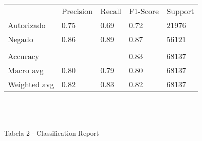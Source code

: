 

\begin{tabular}{lllll}
             & Precision & Recall & F1-Score & Support \\
Autorizado   & 0.75      & 0.69   & 0.72     & 21976   \\
Negado       & 0.86      & 0.89   & 0.87     & 56121   \\
             &           &        &          &         \\
Accuracy     &           &        & 0.83     & 68137   \\
Macro avg    & 0.80      & 0.79   & 0.80     & 68137   \\
Weighted avg & 0.82      & 0.83   & 0.82     & 68137  
\end{tabular}
\label{classification_report}
\\
\\
\\
\caption{Tabela 2 - Classification Report}
\\


